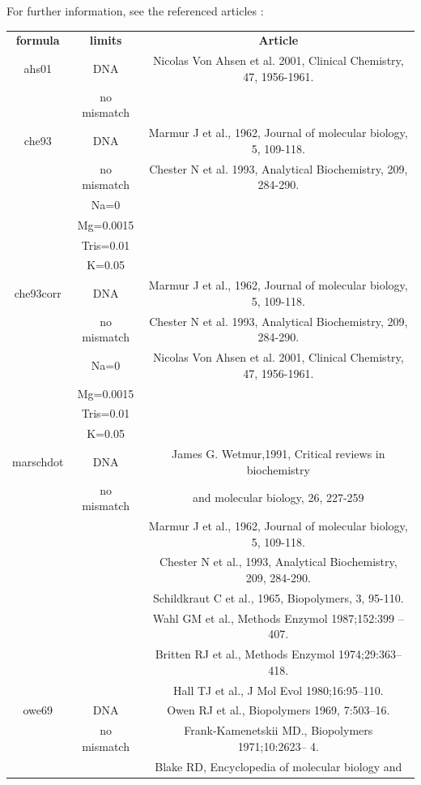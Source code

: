 \documentclass{article}
\begin{document}
For further information, see the referenced articles :
\begin{table}[h]
\begin{tabular}[h]{| c | c | c |}
\textbf{formula} & \textbf{limits} & \textbf{Article} \\ 
ahs01 & DNA & Nicolas Von Ahsen et al. 2001, Clinical Chemistry, 47, 1956-1961. \\
 & no mismatch & \\
che93 & DNA & Marmur J et al., 1962, Journal of molecular biology, 5, 109-118. \\
 & no mismatch & Chester N et al. 1993, Analytical Biochemistry, 209, 284-290. \\
 & Na=0 & \\
 & Mg=0.0015 & \\
 & Tris=0.01 & \\ 
 & K=0.05 & \\
che93corr & DNA & Marmur J et al., 1962, Journal of molecular biology, 5, 109-118. \\
 & no mismatch & Chester N et al. 1993, Analytical Biochemistry, 209, 284-290. \\
 & Na=0 & Nicolas Von Ahsen et al. 2001, Clinical Chemistry, 47, 1956-1961. \\
 & Mg=0.0015 & \\
 & Tris=0.01 & \\ 
 & K=0.05 & \\
marschdot & DNA & James G. Wetmur,1991, Critical reviews in biochemistry \\
 & no mismatch & and molecular biology, 26, 227-259 \\
 & & Marmur J et al., 1962, Journal of molecular biology, 5, 109-118. \\
 & & Chester N et al., 1993, Analytical Biochemistry, 209, 284-290. \\
 & & Schildkraut C et al., 1965, Biopolymers, 3, 95-110. \\
 & & Wahl GM et al., Methods Enzymol 1987;152:399 – 407. \\
 & & Britten RJ et al., Methods Enzymol 1974;29:363–418. \\
 & & Hall TJ et al., J Mol Evol 1980;16:95–110.\\
owe69 & DNA & Owen RJ et al., Biopolymers 1969, 7:503–16. \\
 & no mismatch & Frank-Kamenetskii MD., Biopolymers 1971;10:2623– 4. \\
 & & Blake RD, Encyclopedia of molecular biology and \\

\end{tabular}
\end{table}
\end{document}
